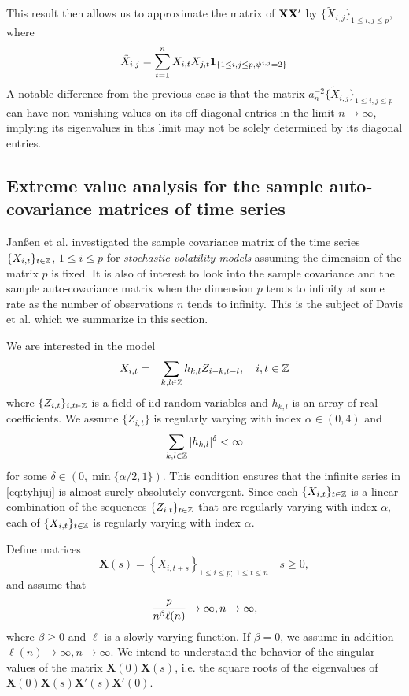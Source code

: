 This result then allows us to approximate the matrix of $\mathbf{XX'}$
by
$\{\tilde X_{i,j}\}_{1 \leq i,j \leq p}$, where
\[
\tilde X_{i,j} = \sum_{t=1}^n X_{i,t} X_{j,t}
\mathbf{1}_{\{1 \leq i,j \leq p, \psi^{i,j} = 2\}}
\]
A notable difference from the previous case is that the matrix
$a_{n}^{-2}\{\tilde X_{i,j}\}_{1 \leq i,j \leq p}$ can have non-vanishing
values on its off-diagonal entries in the limit
$n \to \infty$, implying its eigenvalues in this limit may not be
solely determined by its diagonal entries.

\subsection{Extreme value analysis for the sample auto-covariance
  matrices of time series}
Jan\ss en et al. \cite{janssen:mikosch:rezapour:xie:2016} investigated
the sample covariance matrix of the time series
$\{X_{i,t}\}_{t \in \mathbb Z}$, $1 \leq i \leq p$ for
{\em stochastic volatility models} assuming the dimension
of the matrix $p$ is fixed. It is also of interest to look into the
sample covariance and the sample auto-covariance matrix when the dimension
$p$ tends to infinity at some rate as the number of observations $n$ tends
to infinity. This is the subject of Davis et al.
\cite{davis:mikosch:heiny:xie:2015} which we summarize in this section.

We are interested in the model
\begin{eqnarray}
  X_{i,t} &=& \sum_{k,l \in \mathbb Z} h_{k,l} Z_{i-k, t-l},
  \quad i,t \in \mathbb Z \label{eq:tyhjuj}
\end{eqnarray}
where $\{Z_{i,t}\}_{i,t \in \mathbb Z}$ is a field of iid random
variables and $h_{k,l}$ is an array of real coefficients. We
assume $\{Z_{i,t}\}$ is regularly varying with index
$\alpha \in (0, 4)$ and
\[
\sum_{k,l \in \mathbb Z} |h_{k,l}|^\delta < \infty
\]
for some $\delta \in (0, \min\{\alpha/2, 1\})$. This condition ensures
that the infinite series in \eqref{eq:tyhjuj} is almost surely
absolutely convergent. Since each $\{X_{i,t}\}_{t \in \mathbb Z}$
is a linear combination of the sequences $\{Z_{i,t}\}_{t \in \mathbb Z}$
that are regularly varying with index $\alpha$, each of
$\{X_{i,t}\}_{t \in \mathbb Z}$ is regularly varying with index $\alpha$.

Define matrices
\[
\mathbf X(s) = \left\{X_{i, t+s}\right\}_{1 \leq i \leq p;\; 1 \leq t \leq n}
\quad
s \geq 0,
\]
and assume that
\[
{p \over n^\beta \ell(n)} \to \infty, n \to \infty,
\]
where $\beta \geq 0$ and $\ell$ is a slowly varying function.
If $\beta = 0$, we assume in addition $\ell(n) \to \infty, n\to\infty$.
We intend to understand the behavior of the singular values of the
matrix $\mathbf X(0) \mathbf X(s)$, i.e. the square roots of the
eigenvalues of
$\mathbf X(0) \mathbf X(s) \mathbf X'(s) \mathbf X'(0)$.

